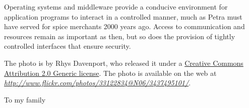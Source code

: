 \documentclass[11pt]{book}
\begin{document}
Operating systems and middleware provide a conducive environment for application programs to interact in a controlled manner, much as Petra must have served for spice merchants 2000 years ago. Access to communication and resources remain as important as then, but so does the provision of tightly controlled interfaces that ensure security.

The photo is by Rhys Davenport, who released it under a \href{http://creativecommons.org/licenses/by/2.0/deed.en}{Creative Commons Attribution 2.0 Generic license}. The photo is available on the web at \textit{\url{http://www.flickr.com/photos/33122834@N06/3437495101/}}.
\fi

\cleardoublepage\thispagestyle{empty}
\vspace*{10em}\centerline{To my family}

\tableofcontents

\makeatletter
\let\@oldmakeschapterhead\@makeschapterhead
\def\@makeschapterhead#1{\addcontentsline{toc}{chapter}{#1}%
  \@oldmakeschapterhead{#1}}
\renewcommand\thechapterenumi{\thechapter.\@arabic\c@chapterenumi}
\newcommand\labelchapterenumi{\thechapterenumi}
\def\chapterEnumerate{%
  \ifnum \@enumdepth >0\@toodeep\else
    \advance\@enumdepth\@ne
    \edef\@enumctr{chapterenum\romannumeral\the\@enumdepth}%
      \expandafter
      \list
        \csname label\@enumctr\endcsname
        {\usecounter\@enumctr\def\makelabel##1{\hss\llap{##1}}}%
  \fi}
\let\endchapterEnumerate =\endlist
\makeatother



\mainmatter













\appendix


\backmatter

\cleardoublepage
\printindex
\end{document}

